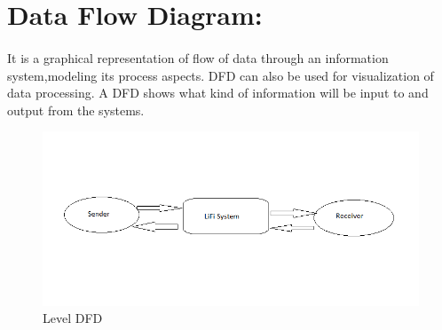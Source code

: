 \documentclass[11pt,a4paper]{report}
\begin{document}
\section*{Data Flow Diagram:}
\paragraph{}It is a graphical representation of flow of data through an information system,modeling its process aspects. DFD can also be used for visualization of data processing. A DFD shows what kind of information will be input to and output from the systems.
\begin{figure}[h]
	\centering
	\includegraphics[width=6in]{Data_flow.png}
	\begin{center}\caption{Level  DFD} \end{center}
	\label{LABEL}
\end{figure}
\end{document}
